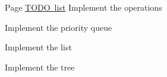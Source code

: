 
\begin{DoxyRefList}
\item[Page \mbox{\hyperlink{TODO_LIST}{T\+O\+DO list}} ]\label{todo__todo000001}%
%
Implement the operations 

Implement the priority queue 

Implement the list 

Implement the tree 
\end{DoxyRefList}